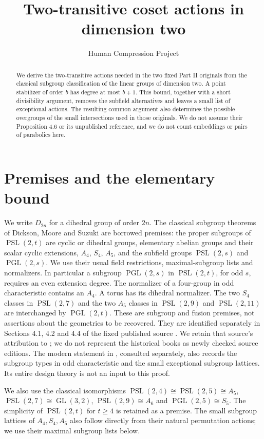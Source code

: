 \documentclass[11pt]{article}
\title{Two-transitive coset actions in dimension two}
\author{Human Compression Project}\date{}
\newcommand{\PSL}{\operatorname{PSL}}
\newcommand{\PGL}{\operatorname{PGL}}
\begin{document}
\maketitle
\begin{abstract}
We derive the two-transitive actions needed in the two fixed Part II
originals from the classical subgroup classification of the linear
groups of dimension two. A point stabilizer of order $b$ has degree
at most $b+1$. This bound, together with a short divisibility argument,
removes the subfield alternatives and leaves a small list of exceptional
actions. The resulting common argument also determines the possible
overgroups of the small intersections used in those originals. We do
not assume their Proposition 4.6 or its unpublished reference, and
we do not count embeddings or pairs of parabolics here.
\end{abstract}

\section{Premises and the elementary bound}
We write $D_{2n}$ for a dihedral group of order $2n$. The classical
subgroup theorems of Dickson, Moore and Suzuki are borrowed premises:
the proper subgroups of $\PSL(2,t)$ are cyclic or dihedral groups,
elementary abelian groups and their scalar cyclic extensions, $A_4$,
$S_4$, $A_5$, and the subfield groups $\PSL(2,s)$ and $\PGL(2,s)$.
We use their usual field restrictions, maximal-subgroup lists and
normalizers. In particular a subgroup $\PGL(2,s)$ in $\PSL(2,t)$,
for odd $s$, requires an even extension degree. The normalizer of a
four-group in odd characteristic contains an $A_4$. A torus has its
dihedral normalizer. The two $S_4$ classes in $\PSL(2,7)$ and the
two $A_5$ classes in $\PSL(2,9)$ and $\PSL(2,11)$ are interchanged
by $\PGL(2,t)$. These are subgroup and fusion premises, not assertions
about the geometries to be recovered. They are identified separately
in Sections 4.1, 4.2 and 4.4 of the fixed published source
\cite{source}. We retain that source's attribution to
\cite{dickson,moore,suzuki}; we do not represent the historical
books as newly checked source editions. The modern statement in
\cite[Theorem 2 and Lemmas 1--2]{cameron}, consulted separately,
also records the subgroup types in odd characteristic and the
small exceptional subgroup lattices. Its entire design theory is
not an input to this proof.

We also use the classical isomorphisms
$\PSL(2,4)\cong\PSL(2,5)\cong A_5$,
$\PSL(2,7)\cong\operatorname{GL}(3,2)$,
$\PSL(2,9)\cong A_6$ and $\PGL(2,5)\cong S_5$.
The simplicity of $\PSL(2,t)$ for $t\geq4$ is retained as a premise.
The small subgroup lattices of $A_4,S_4,A_5$ also follow directly
from their natural permutation actions; we use their maximal
subgroup lists below.
\end{document}
